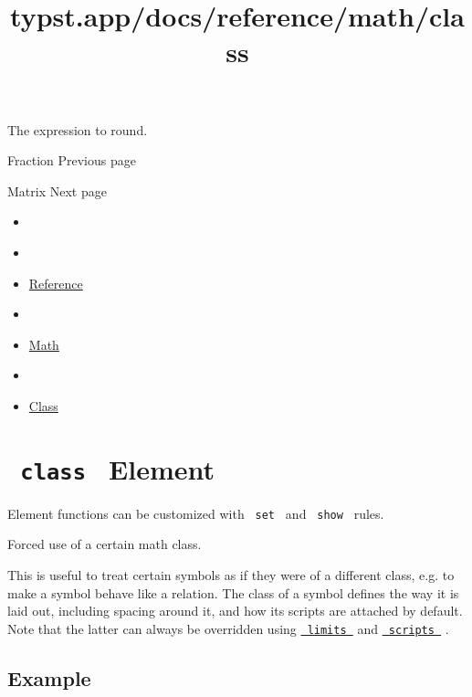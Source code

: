 The expression to round.

\href{/docs/reference/math/frac/}{\pandocbounded{}}

{ Fraction } { Previous page }

\href{/docs/reference/math/mat/}{\pandocbounded{}}

{ Matrix } { Next page }


\title{typst.app/docs/reference/math/class}

\begin{itemize}
\tightlist
\item
  \href{/docs}{}
\item
  
\item
  \href{/docs/reference/}{Reference}
\item
  
\item
  \href{/docs/reference/math/}{Math}
\item
  
\item
  \href{/docs/reference/math/class/}{Class}
\end{itemize}

\section{\texorpdfstring{\texttt{\ class\ } {{ Element
}}}{ class   Element }}\label{summary}

\label{element-tooltip}
Element functions can be customized with \texttt{\ set\ } and
\texttt{\ show\ } rules.

Forced use of a certain math class.

This is useful to treat certain symbols as if they were of a different
class, e.g. to make a symbol behave like a relation. The class of a
symbol defines the way it is laid out, including spacing around it, and
how its scripts are attached by default. Note that the latter can always
be overridden using
\href{/docs/reference/math/attach/\#functions-limits}{\texttt{\ limits\ }}
and
\href{/docs/reference/math/attach/\#functions-scripts}{\texttt{\ scripts\ }}
.

\subsection{Example}\label{example}

